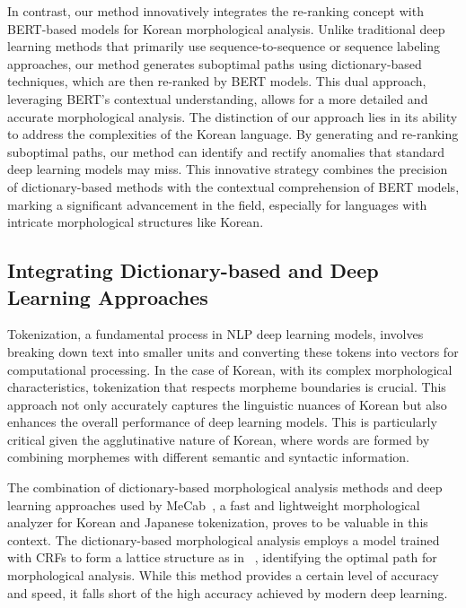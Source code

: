 \documentclass[AMS,STIX2COL]{WileyNJD-v2}
\begin{document}
    In contrast, our method innovatively integrates the re-ranking concept with BERT-based models for Korean morphological analysis.
    Unlike traditional deep learning methods that primarily use sequence-to-sequence or sequence labeling approaches, our method generates suboptimal paths using dictionary-based techniques, which are then re-ranked by BERT models.
    This dual approach, leveraging BERT's contextual understanding, allows for a more detailed and accurate morphological analysis.
    The distinction of our approach lies in its ability to address the complexities of the Korean language.
    By generating and re-ranking suboptimal paths, our method can identify and rectify anomalies that standard deep learning models may miss.
    This innovative strategy combines the precision of dictionary-based methods with the contextual comprehension of BERT models, marking a significant advancement in the field, especially for languages with intricate morphological structures like Korean.

    \subsection{Integrating Dictionary-based and Deep Learning Approaches}\label{subsec:integrating-dictionary-based-and-deep-learning-approaches}
    Tokenization, a fundamental process in NLP deep learning models, involves breaking down text into smaller units and converting these tokens into vectors for computational processing.
    In the case of Korean, with its complex morphological characteristics, tokenization that respects morpheme boundaries is crucial.
    This approach not only accurately captures the linguistic nuances of Korean but also enhances the overall performance of deep learning models.
    This is particularly critical given the agglutinative nature of Korean, where words are formed by combining morphemes with different semantic and syntactic information.

    The combination of dictionary-based morphological analysis methods and deep learning approaches used by MeCab~\cite{MeCab}, a fast and lightweight morphological analyzer for Korean and Japanese tokenization, proves to be valuable in this context.
    The dictionary-based morphological analysis employs a model trained with CRFs to form a lattice structure as in ~\cite{Kudo2004, NaSH2014, NaSH2018}, identifying the optimal path for morphological analysis.
    While this method provides a certain level of accuracy and speed, it falls short of the high accuracy achieved by modern deep learning.
\end{document}
